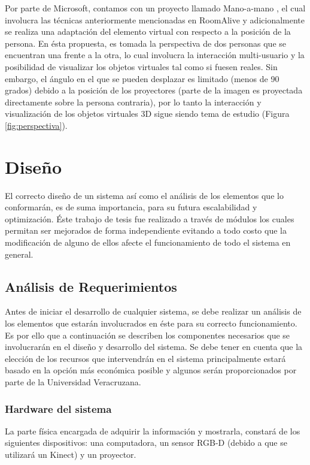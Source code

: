 \documentclass[a4paper,openright,12pt]{report}
\begin{document}
Por parte de Microsoft\textregistered, contamos con un proyecto llamado Mano-a-mano \citep{benko2014}, el cual involucra las técnicas anteriormente mencionadas en RoomAlive y adicionalmente se realiza una adaptación del elemento virtual con respecto a la posición de la persona. En ésta propuesta, es tomada la perspectiva de dos personas que se encuentran una frente a la otra, lo cual involucra la interacción multi-usuario y la posibilidad de visualizar los objetos virtuales tal como si fuesen reales. Sin embargo, el ángulo en el que se pueden desplazar es limitado (menos de 90 grados) debido a la posición de los proyectores (parte de la imagen es proyectada directamente sobre la persona contraria), por lo tanto la interacción y visualización de los objetos virtuales 3D sigue siendo tema de estudio (Figura \ref{fig:perspectiva}).%

\chapter{Dise\~no}\label{cap.diseno}
El correcto diseño de un sistema así como el análisis de los elementos que lo conformarán, es de suma importancia, para su futura escalabilidad y optimización. Éste trabajo de tesis fue realizado a través de módulos los cuales permitan ser mejorados de forma independiente evitando a todo costo que la modificación de alguno de ellos afecte el funcionamiento de todo el sistema en general.\\
\section{Análisis de Requerimientos}
Antes de iniciar el desarrollo de cualquier sistema, se debe realizar un análisis de los elementos que estarán involucrados en éste para su correcto funcionamiento. Es por ello que a continuación se describen los componentes necesarios que se involucrarán en el diseño y desarrollo del sistema. Se debe tener en cuenta que la elección de los recursos que intervendrán en el sistema principalmente estará basado en la opción más económica posible y algunos serán proporcionados por parte de la Universidad Veracruzana.

\subsection{Hardware del sistema}
La parte física encargada de adquirir la información y mostrarla, constará de los siguientes dispositivos: una computadora, un sensor RGB-D (debido a que se utilizará un Kinect\textcopyright) y un proyector.\\
\end{document}
